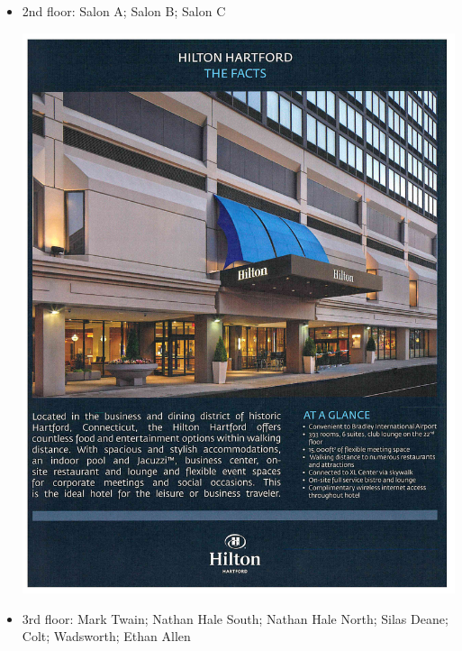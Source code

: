 \documentclass[10pt]{article}
\begin{document}
\vfill
\begin{itemize}
\item 2nd floor: Salon A; Salon B; Salon C
  
  \includegraphics[page=3, width=\textwidth, viewport=.23in 5.3in
  8.1in 9.07in, clip=true]{hilton.pdf}
  \vfill
\item 3rd floor: Mark Twain; Nathan Hale South; Nathan Hale North;
  Silas Deane; Colt; Wadsworth; Ethan Allen
  

\end{itemize}
\end{document}
